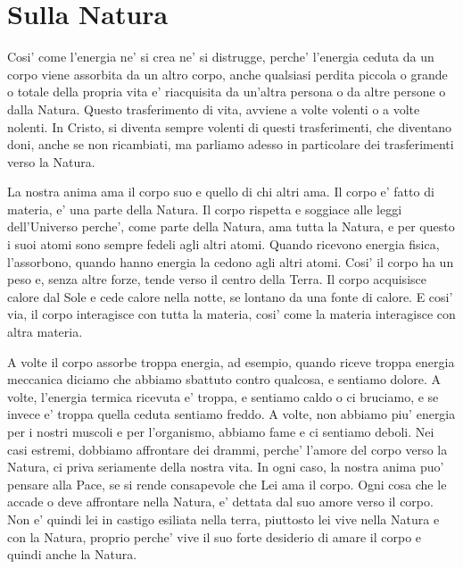 \chapter{Sulla Natura}

Cosi' come l'energia ne' si crea ne' si distrugge, perche' l'energia ceduta da un corpo viene assorbita da un altro corpo, anche qualsiasi perdita piccola o grande o totale della propria vita e' riacquisita da un'altra persona o da altre persone o dalla Natura. Questo trasferimento di vita, avviene a volte volenti o a volte nolenti. In Cristo, si diventa sempre volenti di questi trasferimenti, che diventano doni, anche se non ricambiati, ma parliamo adesso in particolare dei trasferimenti verso la Natura. 

La nostra anima ama il corpo suo e quello di chi altri ama. Il corpo e' fatto di materia, e' una parte della Natura. Il corpo rispetta e soggiace alle leggi dell'Universo perche', come parte della Natura, ama tutta la Natura, e per questo i suoi atomi sono sempre fedeli agli altri atomi. Quando ricevono energia fisica, l'assorbono, quando hanno energia la cedono agli altri atomi.
Cosi' il corpo ha un peso e, senza altre forze, tende verso il centro della Terra. Il corpo acquisisce calore dal Sole e cede calore nella notte, se lontano da una fonte di calore. E cosi' via, il corpo interagisce con tutta la materia, cosi' come la materia interagisce con altra materia.

A volte il corpo assorbe troppa energia, ad esempio, quando riceve troppa energia meccanica diciamo che abbiamo sbattuto contro qualcosa, e sentiamo dolore. A volte, l'energia termica ricevuta e' troppa, e sentiamo caldo o ci bruciamo, e se invece e' troppa quella ceduta sentiamo freddo. A volte, non abbiamo piu' energia per i nostri muscoli e per l'organismo, abbiamo fame e ci sentiamo deboli. Nei casi estremi, dobbiamo affrontare dei drammi, perche' l'amore del corpo verso la Natura, ci priva seriamente della nostra vita. In ogni caso, la nostra anima puo' pensare alla Pace, se si rende consapevole che Lei ama il corpo. Ogni cosa che le accade o deve affrontare nella Natura, e' dettata dal suo amore verso il corpo. Non e' quindi lei in castigo esiliata nella terra, piuttosto lei vive nella Natura e con la Natura, proprio perche' vive il suo forte desiderio di amare il corpo e quindi anche la Natura. 

